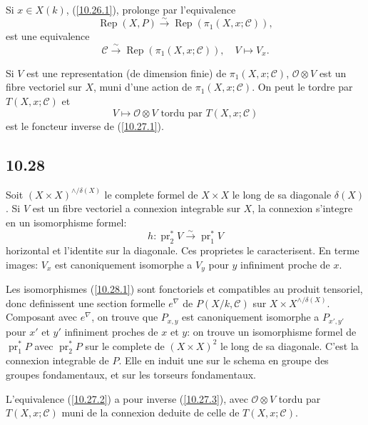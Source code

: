 \documentclass[12pt,a4paper]{article}
\theoremstyle{plain}
\theoremstyle{definition}
\theoremstyle{remark}
\DeclareMathOperator{\pr}{pr}
\DeclareMathOperator{\Rep}{Rep}
\begin{document}
Si $x \in X(k)$, (\ref{10.26.1}), prolonge par l'equivalence
\begin{equation}\label{10.27.1}
\Rep(X, P) \xrightarrow{\sim} \Rep(\pi_1(X, x; \mathcal{C})), \tag{10.27.1}
\end{equation}
est une equivalence
\begin{equation}\label{10.27.2}
\mathcal{C} \xrightarrow{\sim} \Rep(\pi_1(X, x; \mathcal{C})), \quad V \mapsto V_x. \tag{10.27.2}
\end{equation}

Si $V$ est une representation (de dimension finie) de $\pi_1(X, x; \mathcal{C})$, $\mathcal{O} \otimes V$ est un fibre vectoriel sur $X$, muni d'une action de $\pi_1(X, x; \mathcal{C})$. On peut le tordre par $T(X, x; \mathcal{C})$ et
\begin{equation}\label{10.27.3}
V \longmapsto \mathcal{O} \otimes V \text{ tordu par } T(X, x; \mathcal{C}) \tag{10.27.3}
\end{equation}
est le foncteur inverse de (\ref{10.27.1}).

\subsection*{10.28}

Soit $(X \times X)^{\wedge/\delta(X)}$ le complete formel de $X \times X$ le long de sa diagonale $\delta(X)$. Si $V$ est un fibre vectoriel a connexion integrable sur $X$, la connexion s'integre en un isomorphisme formel:
\begin{equation}\label{10.28.1}
h: \pr_2^* V \xrightarrow{\sim} \pr_1^* V \tag{10.28.1}
\end{equation}
horizontal et l'identite sur la diagonale. Ces proprietes le caracterisent. En terme images: $V_x$ est canoniquement isomorphe a $V_y$ pour $y$ infiniment proche de $x$.

Les isomorphismes (\ref{10.28.1}) sont fonctoriels et compatibles au produit tensoriel, donc definissent une section formelle $e^\nabla$ de $P(X/k, \mathcal{C})$ sur $X \times X^{\wedge/\delta(X)}$. Composant avec $e^\nabla$, on trouve que $P_{x,y}$ est canoniquement isomorphe a $P_{x',y'}$ pour $x'$ et $y'$ infiniment proches de $x$ et $y$: on trouve un isomorphisme formel de $\pr_1^* P$ avec $\pr_2^* P$ sur le complete de $(X \times X)^2$ le long de sa diagonale. C'est la connexion integrable de $P$. Elle en induit une sur le schema en groupe des groupes fondamentaux, et sur les torseurs fondamentaux.

L'equivalence (\ref{10.27.2}) a pour inverse (\ref{10.27.3}), avec $\mathcal{O} \otimes V$ tordu par $T(X, x; \mathcal{C})$ muni de la connexion deduite de celle de $T(X, x; \mathcal{C})$.
\end{document}

